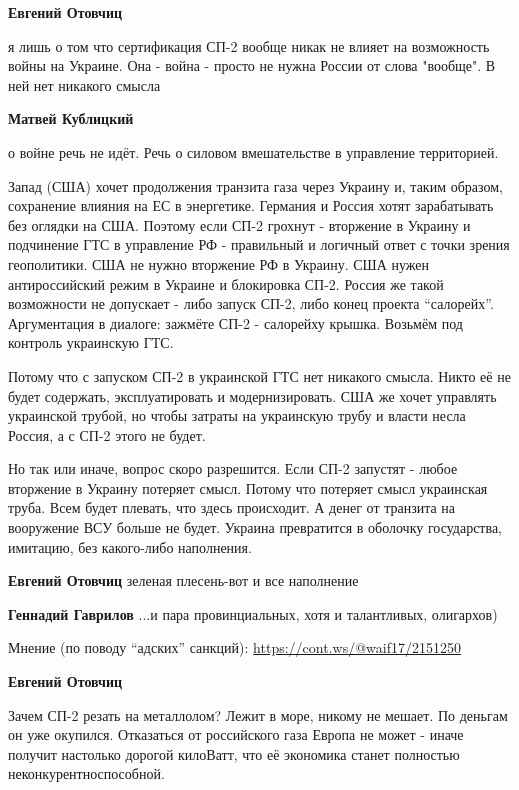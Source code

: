 \begin{itemize}
\begin{itemize}
\textbf{Евгений Отовчиц} 

я лишь о том что сертификация СП-2 вообще никак не влияет на возможность войны
на Украине. Она - война - просто не нужна России от слова "вообще". В ней нет
никакого смысла

\textbf{Матвей Кублицкий} 

о войне речь не идёт. Речь о силовом вмешательстве в управление территорией.

Запад (США) хочет продолжения транзита газа через Украину и, таким образом,
сохранение влияния на ЕС в энергетике. Германия и Россия хотят зарабатывать без
оглядки на США. Поэтому если СП-2 грохнут - вторжение в Украину и подчинение
ГТС в управление РФ - правильный и логичный ответ с точки зрения геополитики.
США не нужно вторжение РФ в Украину. США нужен антироссийский режим в Украине и
блокировка СП-2. Россия же такой возможности не допускает - либо запуск СП-2,
либо конец проекта \enquote{салорейх}. Аргументация в диалоге: зажмёте СП-2 - салорейху
крышка. Возьмём под контроль украинскую ГТС.

Потому что с запуском СП-2 в украинской ГТС нет никакого смысла. Никто её не
будет содержать, эксплуатировать и модернизировать. США же хочет управлять
украинской трубой, но чтобы затраты на украинскую трубу и власти несла Россия,
а с СП-2 этого не будет.

Но так или иначе, вопрос скоро разрешится. Если СП-2 запустят - любое вторжение
в Украину потеряет смысл. Потому что потеряет смысл украинская труба. Всем
будет плевать, что здесь происходит. А денег от транзита на вооружение ВСУ
больше не будет. Украина превратится в оболочку государства, имитацию, без
какого-либо наполнения.

\textbf{Евгений Отовчиц} зеленая плесень-вот и все наполнение

\textbf{Геннадий Гаврилов} ...и пара провинциальных, хотя и талантливых, олигархов)

Мнение (по поводу \enquote{адских} санкций):
\url{https://cont.ws/@waif17/2151250}

\textbf{Евгений Отовчиц} 

Зачем СП-2 резать на металлолом? Лежит в море, никому не мешает. По деньгам он
уже окупился. Отказаться от российского газа Европа не может - иначе получит
настолько дорогой килоВатт, что её экономика станет полностью
неконкурентноспособной.


\end{itemize}
\end{itemize}
